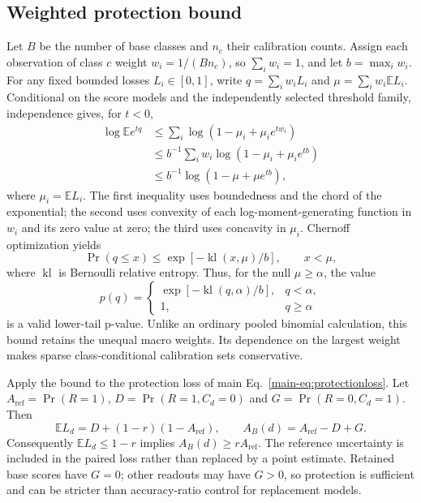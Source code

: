 \documentclass[preprint,review,12pt]{elsarticle}
\begin{document}
\subsection{Weighted protection bound}
Let $B$ be the number of base classes and $n_c$ their calibration counts. Assign each observation of class $c$ weight $w_i=1/(Bn_c)$, so $\sum_iw_i=1$, and let $b=\max_iw_i$. For any fixed bounded losses $L_i\in[0,1]$, write $q=\sum_iw_iL_i$ and $\mu=\sum_iw_i\mathbb E L_i$. Conditional on the score models and the independently selected threshold family, independence gives, for $t<0$,
\begin{align}
 \log\mathbb E e^{tq}
 &\leq\sum_i\log(1-\mu_i+\mu_i e^{tw_i})\\
 &\leq b^{-1}\sum_iw_i\log(1-\mu_i+\mu_i e^{tb})\\
 &\leq b^{-1}\log(1-\mu+\mu e^{tb}),
\end{align}
where $\mu_i=\mathbb E L_i$. The first inequality uses boundedness and the chord of the exponential; the second uses convexity of each log-moment-generating function in $w_i$ and its zero value at zero; the third uses concavity in $\mu_i$. Chernoff optimization yields
\begin{equation}
 \Pr(q\leq x)\leq\exp[-\operatorname{kl}(x,\mu)/b],\qquad x<\mu,
\end{equation}
where $\operatorname{kl}$ is Bernoulli relative entropy. Thus, for the null $\mu\geq\alpha$, the value
\begin{equation}
 p(q)=\begin{cases}
 \exp[-\operatorname{kl}(q,\alpha)/b],&q<\alpha,\\
 1,&q\geq\alpha
 \end{cases}
\end{equation}
is a valid lower-tail p-value. Unlike an ordinary pooled binomial calculation, this bound retains the unequal macro weights. Its dependence on the largest weight makes sparse class-conditional calibration sets conservative.

Apply the bound to the protection loss of main Eq.~\eqref{main-eq:protectionloss}. Let $A_{\mathrm{ref}}=\Pr(R=1)$, $D=\Pr(R=1,C_d=0)$ and $G=\Pr(R=0,C_d=1)$. Then
\begin{equation}
 \mathbb E L_d=D+(1-r)(1-A_{\mathrm{ref}}),\qquad
 A_B(d)=A_{\mathrm{ref}}-D+G.
\end{equation}
Consequently $\mathbb E L_d\leq1-r$ implies $A_B(d)\geq rA_{\mathrm{ref}}$. The reference uncertainty is included in the paired loss rather than replaced by a point estimate. Retained base scores have $G=0$; other readouts may have $G>0$, so protection is sufficient and can be stricter than accuracy-ratio control for replacement models.
\end{document}
